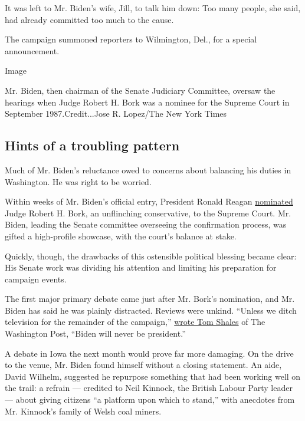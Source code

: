 It was left to Mr. Biden's wife, Jill, to talk him down: Too many
people, she said, had already committed too much to the cause.

The campaign summoned reporters to Wilmington, Del., for a special
announcement.

Image

Mr. Biden, then chairman of the Senate Judiciary Committee, oversaw the
hearings when Judge Robert H. Bork was a nominee for the Supreme Court
in September 1987.Credit...Jose R. Lopez/The New York Times

\hypertarget{hints-of-a-troubling-pattern}{%
\subsection{Hints of a troubling
pattern}\label{hints-of-a-troubling-pattern}}

Much of Mr. Biden's reluctance owed to concerns about balancing his
duties in Washington. He was right to be worried.

Within weeks of Mr. Biden's official entry, President Ronald Reagan
\href{https://www.nytimes3xbfgragh.onion/1987/07/02/us/bork-picked-for-high-court-reagan-cites-his-restraint-confirmation-fight-looms.html}{nominated}
Judge Robert H. Bork, an unflinching conservative, to the Supreme Court.
Mr. Biden, leading the Senate committee overseeing the confirmation
process, was gifted a high-profile showcase, with the court's balance at
stake.

Quickly, though, the drawbacks of this ostensible political blessing
became clear: His Senate work was dividing his attention and limiting
his preparation for campaign events.

The first major primary debate came just after Mr. Bork's nomination,
and Mr. Biden has said he was plainly distracted. Reviews were unkind.
``Unless we ditch television for the remainder of the campaign,''
\href{https://www.washingtonpost.com/archive/lifestyle/1987/07/03/the-diverting-democrats/7d31e08c-fcd3-4cd7-8006-f0ab5b135ea5/?utm_term=.ff508010ed4e}{wrote
Tom Shales} of The Washington Post, ``Biden will never be president.''

A debate in Iowa the next month would prove far more damaging. On the
drive to the venue, Mr. Biden found himself without a closing statement.
An aide, David Wilhelm, suggested he repurpose something that had been
working well on the trail: a refrain --- credited to Neil Kinnock, the
British Labour Party leader --- about giving citizens ``a platform upon
which to stand,'' with anecdotes from Mr. Kinnock's family of Welsh coal
miners.

